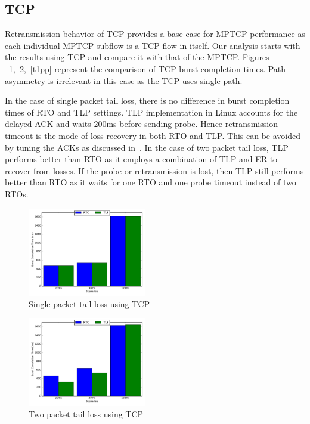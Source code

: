 \documentclass[10pt,draftcls,twocolumn]{IEEEconf}
\begin{document}
\subsection{TCP}
Retransmission behavior of TCP provides a base case for MPTCP performance as each individual MPTCP subflow is a TCP flow in itself. Our analysis
starts with the results using TCP and compare it with that of the MPTCP. Figures ~\ref{t1p},~\ref{t2p},~\ref{t1pp} represent the comparison of TCP 
burst completion times. Path asymmetry is irrelevant in this case as the TCP uses single path.

In the case of single packet tail loss, there is no difference in burst completion times of RTO and TLP settings. TLP implementation in Linux accounts
for the delayed ACK and waits 200ms before sending probe. Hence retransmission timeout is the mode of loss recovery in both RTO and TLP. This can be avoided by tuning
the ACKs as discussed in~\cite{Rajiullah:2015}. In the case of two packet tail loss, TLP performs better than RTO as it employs a combination of TLP and ER to recover from losses. 
If the probe or retransmission is lost, then TLP still performs better than RTO as it waits for one RTO and one probe timeout instead of two RTOs.

\begin{figure}[!ht]
\begin{center}
\includegraphics[angle=0, width=0.46\textwidth,natwidth=578.16,natheight=433.62]{plots/T1P.pdf}
\caption{Single packet tail loss using TCP}\label{t1p}
\end{center}
\end{figure}



\begin{figure}[!ht]
\begin{center}
\includegraphics[angle=0, width=0.46\textwidth,natwidth=578.16,natheight=433.62]{plots/T2P.pdf}
\caption{Two packet tail loss using TCP}\label{t2p}
\end{center}
\end{figure}
\end{document}
